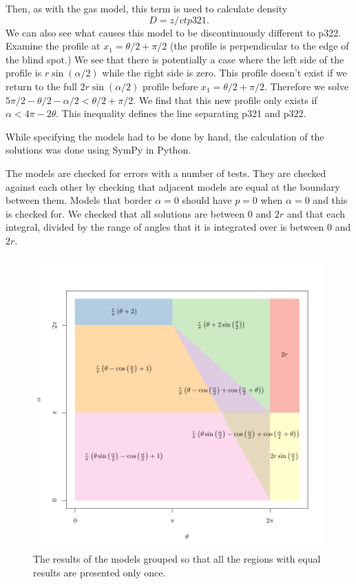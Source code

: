 \documentclass[a4paper,10pt,reqno,oneside]{amsart}
\begin{document}
Then, as with the gas model, this term is used to calculate density
\begin{equation}
D = z/vtp321. 
\end{equation}
We can also see what causes this model to be discontinuously different to p322. Examine the profile at $x_1 = 	\theta/2 + \pi/2$ (the profile is perpendicular to the edge of the blind spot.) We see that there is potentially a case where the left side of the profile is $r\sin( \alpha/2)$ while the right side is zero. This profile doesn't exist if we return to the full $2r\sin( \alpha/2)$ profile before $x_1  = \theta/2 + \pi/2$. Therefore we solve $5\pi/2 - \theta/2 - \alpha/2 <  \theta/2 + \pi/2$. We find that this new profile only exists if $ \alpha < 4\pi - 2 \theta$. This inequality defines the line separating p321 and p322.

While specifying the models had to be done by hand, the calculation of the solutions was done using SymPy \citep{sympy} in Python. 

The models are checked for errors with a number of tests. They are checked against each other by checking that adjacent models are equal at the boundary between them. Models that border $ \alpha = 0$ should have $p = 0$ when $ \alpha = 0$ and this is checked for. We checked that all solutions are between 0 and $2r$ and that each integral, divided by the range of angles that it is integrated over is between 0 and $2r$.


\begin{figure}
\centering
\includegraphics[width=1\textwidth]{imgs/equalModelResults.pdf}
\caption{The results of the models grouped so that all the regions with equal results are presented only once.}
\label{f:equalModelResults}
\end{figure}
\end{document}
